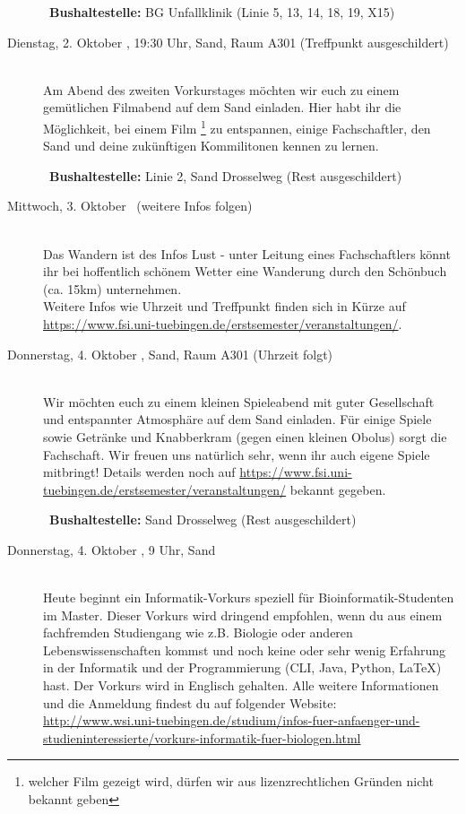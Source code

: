 \begin{description}
~\textbf{Bushaltestelle:} BG Unfallklinik (Linie 5, 13, 14, 18, 19, X15)

\item[Dienstag, 2. Oktober \Jahr, 19:30 Uhr, Sand, Raum A301 (Treffpunkt ausgeschildert)]\ \\
Am Abend des zweiten Vorkurstages möchten wir euch zu einem gemütlichen Filmabend auf dem Sand einladen.
Hier habt ihr die Möglichkeit, bei einem Film \footnote{welcher Film gezeigt wird, dürfen wir aus lizenzrechtlichen Gründen nicht bekannt geben} zu entspannen, einige Fachschaftler, den Sand und deine zukünftigen Kommilitonen kennen zu lernen.

~\textbf{Bushaltestelle:} Linie 2, Sand Drosselweg (Rest ausgeschildert) 

\item[Mittwoch, 3. Oktober \Jahr~(weitere Infos folgen)]\ \\
Das Wandern ist des Infos Lust - unter Leitung eines Fachschaftlers könnt ihr bei hoffentlich schönem Wetter eine Wanderung durch den Schönbuch (ca. 15km) unternehmen. \\
Weitere Infos wie Uhrzeit und Treffpunkt finden sich in Kürze auf \url{https://www.fsi.uni-tuebingen.de/erstsemester/veranstaltungen/}.

\item[Donnerstag, 4. Oktober \Jahr, Sand, Raum A301 (Uhrzeit folgt)]\ \\
Wir möchten euch zu einem kleinen Spieleabend mit guter Gesellschaft und entspannter Atmosphäre auf dem Sand einladen. Für einige Spiele sowie Getränke und Knabberkram (gegen einen kleinen Obolus) sorgt die Fachschaft. Wir freuen uns natürlich sehr, wenn ihr auch eigene Spiele mitbringt! Details werden noch auf \url{https://www.fsi.uni-tuebingen.de/erstsemester/veranstaltungen/} bekannt gegeben.

~\textbf{Bushaltestelle:} Sand Drosselweg (Rest ausgeschildert) 

\ifmaster
\ifbinfo
\item[Donnerstag, 4. Oktober \Jahr, 9 Uhr, Sand]\ \\
 Heute beginnt ein Informatik-Vorkurs speziell für Bioinformatik-Studenten im Master. Dieser Vorkurs wird dringend empfohlen, wenn du aus einem fachfremden Studiengang wie z.B. Biologie oder anderen Lebenswissenschaften kommst und noch keine oder sehr wenig Erfahrung in der Informatik und der Programmierung (CLI, Java, Python, \LaTeX) hast. Der Vorkurs wird in Englisch gehalten. Alle weitere Informationen und die Anmeldung findest du auf folgender Website: \\ \url{http://www.wsi.uni-tuebingen.de/studium/infos-fuer-anfaenger-und-studieninteressierte/vorkurs-informatik-fuer-biologen.html}


\end{description}
